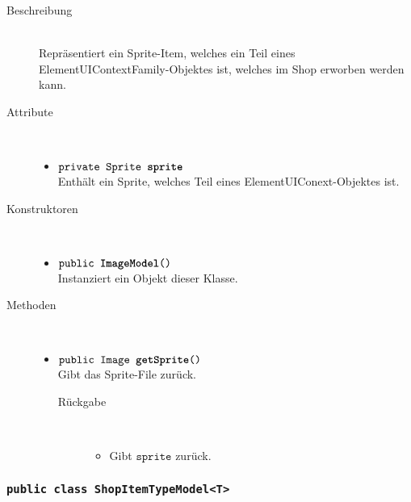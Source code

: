 \begin{description}
\item[Beschreibung] \hfill \\ Repräsentiert ein Sprite-Item, welches ein Teil eines ElementUIContextFamily-Objektes ist, welches im Shop erworben werden kann.

\item[Attribute] \hfill \\
	\vspace{-.8cm}
	\begin{itemize}
		\item $\texttt{private Sprite \textbf{sprite}}$ \\ Enthält ein Sprite, welches Teil eines ElementUIConext-Objektes ist.

		\end{itemize}
	
\item[Konstruktoren] \hfill \\
	\vspace{-.8cm}
	\begin{itemize}
		\item $\texttt{public \textbf{ImageModel}()}$ \\ Instanziert ein Objekt dieser Klasse.

	\end{itemize}
	
\item[Methoden] \hfill \\
	\vspace{-.8cm}
	\begin{itemize}
		\item $\texttt{public Image \textbf{getSprite}()}$ \\ Gibt das Sprite-File zurück.
		\begin{description}
			\item[Rückgabe] \hfill \\
			\vspace{-.8cm}
			\begin{itemize}
				\item Gibt $\texttt{sprite}$ zurück.
			\end{itemize}
			\end{description}
		
	\end{itemize}
\end{description}




\subsubsection{\normalfont \texttt{public class \textbf{ShopItemTypeModel<T>}}}

